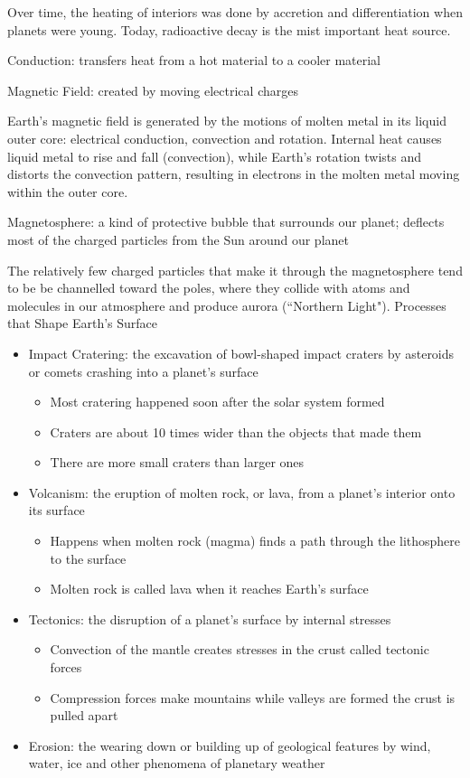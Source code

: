 \documentclass[12pt]{article}
\begin{document}
Over time, the heating of interiors was done by accretion and differentiation when planets were young. Today, radioactive decay is the mist important heat source. 
\begin{definition} Conduction: transfers heat from a hot material to a cooler material \end{definition} 
\begin{definition} Magnetic Field: created by moving electrical charges \end{definition} 
Earth's magnetic field is generated by the motions of molten metal in its liquid outer core: electrical conduction, convection and rotation. Internal heat causes liquid metal to rise and fall (convection), while Earth's rotation twists and distorts the convection pattern, resulting in electrons in the molten metal moving within the outer core. 
\begin{definition} Magnetosphere: a kind of protective bubble that surrounds our planet; deflects most of the charged particles from the Sun around our planet \end{definition} 
The relatively few charged particles that make it through the magnetosphere tend to be be channelled toward the poles, where they collide with atoms and molecules in our atmosphere and produce aurora (``Northern Light"). \newpage
Processes that Shape Earth's Surface \begin{itemize} 
\item Impact Cratering: the excavation of bowl-shaped impact craters by asteroids or comets crashing into a planet's surface \begin{itemize} 
\item Most cratering happened soon after the solar system formed 
\item Craters are about 10 times wider than the objects that made them 
\item There are more small craters than larger ones \end{itemize}
\item Volcanism: the eruption of molten rock, or lava, from a planet's interior onto its surface \begin{itemize} 
\item Happens when molten rock (magma) finds a path through the lithosphere to the surface 
\item Molten rock is called lava when it reaches Earth's surface \end{itemize} 
\item Tectonics: the disruption of a planet's surface by internal stresses \begin{itemize} 
\item Convection of the mantle creates stresses in the crust called tectonic forces 
\item Compression forces make mountains while valleys are formed the crust is pulled apart \end{itemize}
\item Erosion: the wearing down or building up of geological features by wind, water, ice and other phenomena of planetary weather \end{itemize} 
\end{document}
